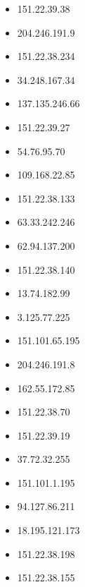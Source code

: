 \documentclass{article}
\begin{document}
\begin{itemize}
            \item 151.22.39.38
        
            \item 204.246.191.9
        
            \item 151.22.38.234
        
            \item 34.248.167.34
        
            \item 137.135.246.66
        
            \item 151.22.39.27
        
            \item 54.76.95.70
        
            \item 109.168.22.85
        
            \item 151.22.38.133
        
            \item 63.33.242.246
        
            \item 62.94.137.200
        
            \item 151.22.38.140
        
            \item 13.74.182.99
        
            \item 3.125.77.225
        
            \item 151.101.65.195
        
            \item 204.246.191.8
        
            \item 162.55.172.85
        
            \item 151.22.38.70
        
            \item 151.22.39.19
        
            \item 37.72.32.255
        
            \item 151.101.1.195
        
            \item 94.127.86.211
        
            \item 18.195.121.173
        
            \item 151.22.38.198
        
            \item 151.22.38.155
        
    
\end{itemize}
\end{document}
